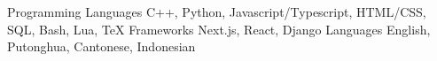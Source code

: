 

\begin{cvskills}

\cvskill
  {Programming Languages} %
  {C++, Python, Javascript/Typescript, HTML/CSS, SQL, Bash, Lua, TeX} %
\cvskill
  {Frameworks} %
  {Next.js, React, Django} %
\cvskill
  {Languages} %
  {English, Putonghua, Cantonese, Indonesian} %

\end{cvskills}

